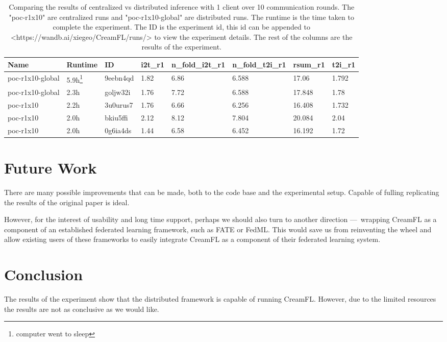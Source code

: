 \documentclass{article}
\begin{document}
\begin{table}
    \centering
    \begin{tabular}{|l|l|l|l|l|l|l|l|}
    \hline
    Name & Runtime & ID & i2t\_r1 & n\_fold\_i2t\_r1 & n\_fold\_t2i\_r1 & rsum\_r1 & t2i\_r1 \\
    \hline
    poc-r1x10-global & 5.9h\footnote{computer went to sleep} & 9eebn4qd & 1.82 & 6.86 & 6.588 & 17.06 & 1.792 \\
    poc-r1x10-global & 2.3h & goljw32i & 1.76 & 7.72 & 6.588 & 17.848 & 1.78 \\
    poc-r1x10 & 2.2h & 3u0urus7 & 1.76 & 6.66 & 6.256 & 16.408 & 1.732 \\
    poc-r1x10 & 2.0h & bkiu5ffi & 2.12 & 8.12 & 7.804 & 20.084 & 2.04 \\
    poc-r1x10 & 2.0h & 0g6ia4ds & 1.44 & 6.58 & 6.452 & 16.192 & 1.72 \\
    \hline
    \end{tabular}
    \caption{Comparing the results of centralized vs distributed inference with 1 client over 10 communication rounds. The "poc-r1x10" are centralized runs and "poc-r1x10-global" are distributed runs. The runtime is the time taken to complete the experiment. The ID is the experiment id, this id can be appended to <https://wandb.ai/xiegeo/CreamFL/runs/> to view the experiment details. The rest of the columns are the results of the experiment.}
    \label{table:r1x10}
\end{table}


\section{Future Work}

There are many possible improvements that can be made, both to the code base and the experimental setup. Capable of fulling replicating the results of the original paper is ideal.

However, for the interest of usability and long time support, perhaps we should also turn to another direction ---\ wrapping CreamFL as a component of an established federated learning framework, such as FATE or FedML. This would save us from reinventing the wheel and allow existing users of these frameworks to easily integrate CreamFL as a component of their federated learning system.

\section{Conclusion}

The results of the experiment show that the distributed framework is capable of running CreamFL. However, due to the limited resources the results are not as conclusive as we would like. 



\end{document}
